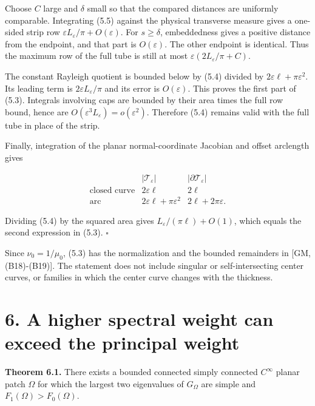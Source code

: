\documentclass[11pt]{article}
\begin{document}
Choose \(C\) large and \(\delta\) small so that the compared distances
are uniformly comparable. Integrating (5.5) against the physical
transverse measure gives a one-sided strip row
\(\varepsilon L_\varepsilon/\pi+O(\varepsilon)\). For \(s\ge\delta\),
embeddedness gives a positive distance from the endpoint, and that part
is \(O(\varepsilon)\). The other endpoint is identical. Thus the maximum
row of the full tube is still at most
\(\varepsilon(2L_\varepsilon/\pi+C)\).

The constant Rayleigh quotient is bounded below by (5.4) divided by
\(2\varepsilon\ell+\pi\varepsilon^2\). Its leading term is
\(2\varepsilon L_\varepsilon/\pi\) and its error is \(O(\varepsilon)\).
This proves the first part of (5.3). Integrals involving caps are
bounded by their area times the full row bound, hence are
\(O(\varepsilon^3 L_\varepsilon)=o(\varepsilon^2)\). Therefore (5.4)
remains valid with the full tube in place of the strip.

Finally, integration of the planar normal-coordinate Jacobian and offset
arclength gives

\[
\begin{array}{c|cc}
&|\mathcal T_\varepsilon|&|\partial\mathcal T_\varepsilon|\\ \hline
\text{closed curve}&2\varepsilon\ell&2\ell\\
\text{arc}&2\varepsilon\ell+\pi\varepsilon^2&2\ell+2\pi\varepsilon.
\end{array}
\tag{5.6}
\]

Dividing (5.4) by the squared area gives
\(L_\varepsilon/(\pi\ell)+O(1)\), which equals the second expression in
(5.3). \(\square\)

Since \(\nu_0=1/\mu_0\), (5.3) has the normalization and the bounded
remainders in {[}GM, (B18)-(B19){]}. The statement does not include
singular or self-intersecting center curves, or families in which the
center curve changes with the thickness.

\section{6. A higher spectral weight can exceed the principal
weight}\label{a-higher-spectral-weight-can-exceed-the-principal-weight}

\textbf{Theorem 6.1.} There exists a bounded connected simply connected
\(C^\infty\) planar patch \(\Omega\) for which the largest two
eigenvalues of \(G_\Omega\) are simple and \(F_1(\Omega)>F_0(\Omega)\).
\end{document}
